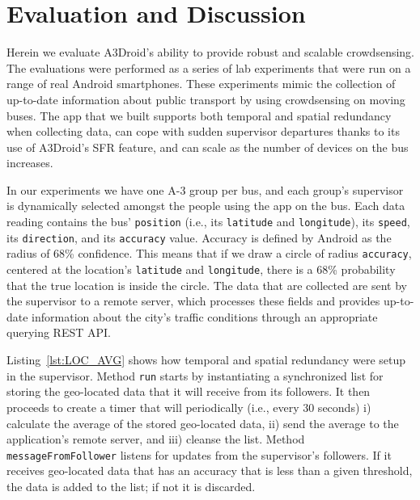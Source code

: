 \section{Evaluation and Discussion}
\label{sec:evaluation}


Herein we evaluate A3Droid's ability to provide robust and scalable crowdsensing. The evaluations were performed as a series of lab experiments that were run on a range of real Android smartphones. These experiments mimic the collection of up-to-date information about public transport by using crowdsensing on moving buses. The app that we built supports both temporal and spatial redundancy when collecting data, can cope with sudden supervisor departures thanks to its use of A3Droid's SFR feature, and can scale as the number of devices on the bus increases. 

In our experiments we have one A-3 group per bus, and each group's supervisor is dynamically selected amongst the people using the app on the bus. Each data reading contains the bus' \texttt{position} (i.e., its \texttt{latitude} and \texttt{longitude}), its \texttt{speed}, its \texttt{direction}, and its \texttt{accuracy} value. Accuracy is defined by Android as the radius of $68$\% confidence. This means that if we draw a circle of radius \texttt{accuracy}, centered at the location's \texttt{latitude} and \texttt{longitude}, there is a $68$\% probability that the true location is inside the circle. The data that are collected are sent by the supervisor to a remote server, which processes these fields and provides up-to-date information about the city's traffic conditions through an appropriate querying REST API. 


Listing~\ref{lst:LOC_AVG} shows how temporal and spatial redundancy were setup in the supervisor. Method \texttt{run} starts by instantiating a synchronized list for storing the geo-located data that it will receive from its followers. It then proceeds to create a timer that will periodically (i.e., every $30$ seconds) i) calculate the average of the stored geo-located data, ii) send the average to the application's remote server, and iii) cleanse the list. Method \texttt{messageFromFollower} listens for updates from the supervisor's followers. If it receives geo-located data that has an accuracy that is less than a given threshold, the data is added to the list; if not it is discarded.

